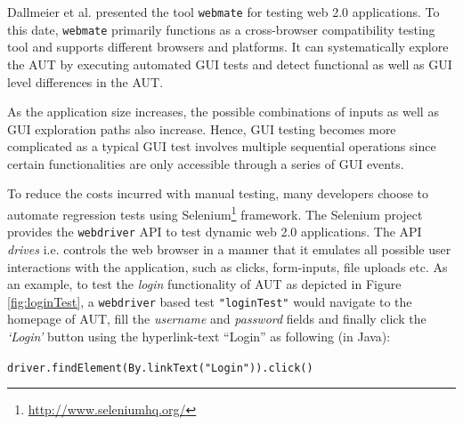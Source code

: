 Dallmeier et al. \cite{webmate} presented the tool \texttt{webmate} for testing web 2.0 applications. To this date, \texttt{webmate} primarily functions as a cross-browser compatibility testing tool and supports different browsers and platforms. It can systematically explore the AUT by executing automated GUI tests and detect functional as well as GUI level differences in the AUT. 

As the application size increases, the possible combinations of inputs as well as GUI exploration paths also increase. Hence, GUI testing becomes more complicated as a typical GUI test involves multiple sequential operations since certain functionalities are only accessible through a series of GUI events.

To reduce the costs incurred with manual testing, many developers choose to automate regression tests using Selenium\footnote{\url{http://www.seleniumhq.org/}} framework. The Selenium project provides the \texttt{webdriver} API to test dynamic web 2.0 applications. The API \textit{drives} i.e. controls the web browser in a manner that it emulates all possible user interactions with the application, such as clicks, form-inputs, file uploads etc. 
As an example, to test the \textit{login} functionality of AUT as depicted in Figure \ref{fig:loginTest}, a \texttt{webdriver} based test \texttt{"loginTest"} would navigate to the homepage of AUT, fill the \textit{username} and \textit{password} fields and finally click the \textit{`Login'} button using the hyperlink-text ``Login'' as following (in Java):
\begin{small}
\texttt{driver.findElement(By.linkText("Login")).click()}
\end{small}



